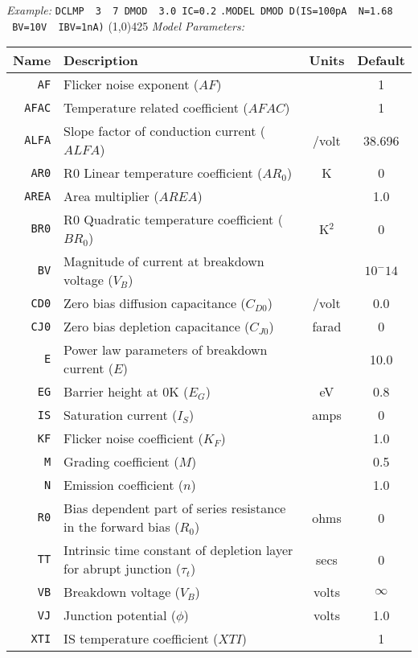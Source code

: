 \textit{Example:}
\newline
\texttt{DCLMP \ 3 \ 7 DMOD \ 3.0 IC=0.2}
\newline
\texttt{.MODEL DMOD D(\texttt{IS}=100pA \ \texttt{N}=1.68 \
\texttt{BV}=10V \ \texttt{IBV}=1nA)}
\newline
\linethickness{0.5mm} \line(1,0){425}
\newline
\textit{Model Parameters:}
\newline
\begin{tabular}{|r|l|c|c|}
\hline
\textbf{Name} & \textbf{Description} & \textbf{Units} & \textbf{Default} \\
\hline
\texttt{AF} & Flicker noise exponent ($AF$) & & 1 \\
\hline
\texttt{AFAC} & Temperature related coefficient ($AFAC$) & & 1 \\
\hline
\texttt{ALFA} & Slope factor of conduction current ($ALFA$) & /volt & 38.696 \\
\hline
\texttt{AR0} & R0 Linear temperature coefficient ($AR_0$) & K & 0 \\
\hline
\texttt{AREA} & Area multiplier ($AREA$) & & 1.0 \\
\hline
\texttt{BR0} & R0 Quadratic temperature coefficient ($BR_0$) & K$^2$ & 0 \\
\hline
\texttt{BV} & Magnitude of current at breakdown voltage ($V_B$) & & $10^-14$ \\
\hline
\texttt{CD0} & Zero bias diffusion capacitance ($C_{D0}$) & /volt & 0.0 \\
\hline
\texttt{CJ0} & Zero bias depletion capacitance ($C_{J0}$) & farad & 0 \\
\hline
\texttt{E} & Power law parameters of breakdown current ($E$) & & 10.0 \\
\hline
\texttt{EG} & Barrier height at 0K ($E_G$) & eV & 0.8 \\
\hline
\texttt{IS} & Saturation current ($I_S$) & amps & 0 \\
\hline
\texttt{KF} & Flicker noise coefficient ($K_F$) & & 1.0 \\
\hline
\texttt{M} & Grading coefficient ($M$) & & 0.5 \\
\hline
\texttt{N} & Emission coefficient ($n$) & & 1.0 \\
\hline
\texttt{R0} & Bias dependent part of series resistance in the forward bias ($R_0$) & ohms & 0\\
\hline
\texttt{TT} & Intrinsic time constant of depletion layer for abrupt junction ($\tau _t$) & secs & 0 \\
\hline
\texttt{VB} & Breakdown voltage ($V_B$)& volts & $\infty$ \\
\hline
\texttt{VJ} & Junction potential ($\phi$) & volts & 1.0 \\
\hline
\texttt{XTI} & IS temperature coefficient ($XTI$) & & 1 \\
\hline
\end{tabular}
